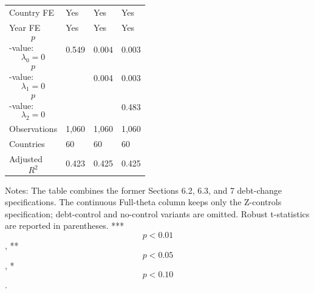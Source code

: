 \begin{table}[H]
\begin{threeparttable}
\begin{tabularx}{\textwidth}{lYYY}
Country FE & Yes & Yes & Yes \\
Year FE & Yes & Yes & Yes \\
$$p$$-value: $$\lambda_0=0$$ & 0.549 & 0.004 & 0.003 \\
$$p$$-value: $$\lambda_1=0$$ &  & 0.004 & 0.003 \\
$$p$$-value: $$\lambda_2=0$$ &  &  & 0.483 \\
Observations & 1,060 & 1,060 & 1,060 \\
Countries & 60 & 60 & 60 \\
Adjusted $$R^2$$ & 0.423 & 0.425 & 0.425 \\
\bottomrule
\end{tabularx}
\begin{tablenotes}[flushleft]\footnotesize
\item Notes: The table combines the former Sections 6.2, 6.3, and 7 debt-change specifications. The continuous Full-theta column keeps only the Z-controls specification; debt-control and no-control variants are omitted. Robust t-statistics are reported in parentheses. *** $$p<0.01$$, ** $$p<0.05$$, * $$p<0.10$$.
\end{tablenotes}
\end{threeparttable}
\end{table}
